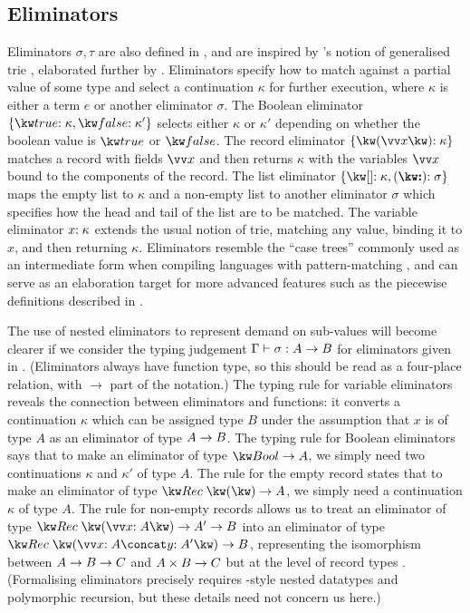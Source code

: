 \subsection{Eliminators}
\label{sec:core-language:syntax-eliminator}
Eliminators $\sigma, \tau$ are also defined in , and are inspired by \citeauthor{connelly95}'s notion of generalised trie \cite{connelly95}, elaborated further by \citet{hinze00}. Eliminators specify how to match against a partial value of some type and select a continuation $\kappa$ for further execution, where $\kappa$ is either a term $e$ or another eliminator $\sigma$. The Boolean eliminator $\elimBool{\kappa}{\kappa'}$ selects either $\kappa$ or $\kappa'$ depending on whether the boolean value is $\exTrue$ or $\exFalse$. The record eliminator $\elimRec{\seq{x}}{\kappa}$ matches a record with fields $\seq{x}$ and then returns $\kappa$ with the variables $\seq{x}$ bound to the components of the record. The list eliminator $\elimList{\kappa}{\sigma}$ maps the empty list to $\kappa$ and a non-empty list to another eliminator $\sigma$ which specifies how the head and tail of the list are to be matched. The variable eliminator ${x}{:}\;{\kappa}$ extends the usual notion of trie, matching any value, binding it to $x$, and then returning $\kappa$. Eliminators resemble the ``case trees'' commonly used as an intermediate form when compiling languages with pattern-matching \cite{graf20}, and can serve as an elaboration target for more advanced features such as the piecewise definitions described in . 



The use of nested eliminators to represent demand on sub-values will become clearer if we consider the typing judgement $\Gamma \vdash \sigma: {A}\rightarrow{B}$ for eliminators given in . (Eliminators always have function type, so this should be read as a four-place relation, with $\to$ part of the notation.) The typing rule for variable eliminators reveals the connection between eliminators and functions: it converts a continuation $\kappa$ which can be assigned type $B$ under the assumption that $x$ is of type $A$ as an eliminator of type ${A}\rightarrow{B}$. The typing rule for Boolean eliminators says that to make an eliminator of type $\tyFun{\tyBool}{A}$, we simply need two continuations $\kappa$ and $\kappa'$ of type $A$. The rule for the empty record states that to make an eliminator of type $\tyFun{\tyRec{}}{A}$, we simply need a continuation $\kappa$ of type $A$. The rule for non-empty records allows us to treat an eliminator of type $\tyFun{\tyRec{\vec{\bind{x}{A}}}}{\tyFun{A'}{B}}$ into an eliminator of type $\tyFun{\tyRec{\vec{\bind{x}{A}} \concat \bind{y}{A'}}}{B}$, representing the isomorphism between ${{A}\rightarrow{B}}\rightarrow{C}$ and ${{A}\times{B}}\rightarrow{C}$ but at the level of record types \cite{hinze00}. (Formalising eliminators precisely requires \citeauthor{bird98}-style nested datatypes \cite{bird98} and polymorphic recursion, but these details need not concern us here.)

